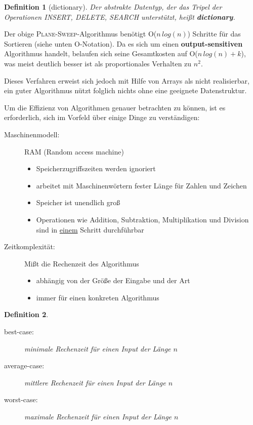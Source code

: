 \documentclass[ngerman]{scrreprt}%
\theoremstyle{break}
\newtheorem{definition}{Definition}
\begin{document}
\begin{definition}[dictionary]
  Der abstrakte Datentyp, der das Tripel der Operationen \textit{INSERT},
  \textit{DELETE}, \textit{SEARCH} unterstützt, heißt \textbf{dictionary}.
\end{definition}

Der obige \textsc{Plane-Sweep}-Algorithmus benötigt O($n\,log(n)$) Schritte
für das Sortieren (siehe unten O-Notation). Da es sich um einen \textbf{output-sensitiven}
Algorithmus handelt, belaufen sich seine Gesamtkosten auf
O($n\,log(n)+k$), was meist deutlich besser ist als proportionales Verhalten
zu $n^2$.

Dieses Verfahren erweist sich jedoch mit Hilfe von Arrays als nicht
realisierbar, ein guter Algorithmus nützt folglich nichts ohne eine
geeignete Datenstruktur.

Um die Effizienz von Algorithmen genauer betrachten zu können, ist es
erforderlich, sich im Vorfeld über einige Dinge zu verständigen:

\begin{description}
 \item[Maschinenmodell:] RAM (Random access machine)
  \begin{itemize}
   \item Speicherzugriffszeiten werden ignoriert
   \item arbeitet mit Maschinenwörtern fester Länge für Zahlen und Zeichen
   \item Speicher ist unendlich groß
   \item Operationen wie Addition, Subtraktion, Multiplikation und Division
    sind in \underline{einem} Schritt durchführbar
  \end{itemize}
 \item[Zeitkomplexität:] Mißt die Rechenzeit des Algorithmus
  \begin{itemize}
   \item{abhängig von der Größe der Eingabe und der Art}
   \item{immer für einen konkreten Algorithmus}
  \end{itemize}
\end{description}

\begin{definition}
  \begin{description}
   \item[best-case:] minimale Rechenzeit für einen Input der Länge $n$
   \item[average-case:] mittlere Rechenzeit für einen Input der Länge $n$
   \item[worst-case:] maximale Rechenzeit für einen Input der Länge $n$
  \end{description}
\end{definition}
\end{document}
